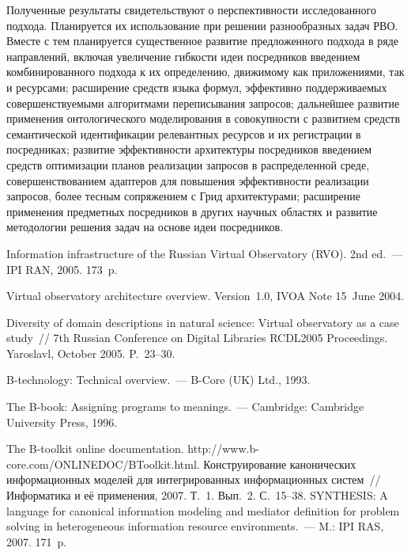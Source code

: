 \begin{multicols}{2}
     Полученные результаты свидетельствуют о перспективности исследованного
подхода. Планируется их использование при решении разнообразных задач
РВО. Вместе с тем планируется существенное развитие
предложенного подхода в ряде направлений, включая увеличение гибкости идеи
посредников введением комбинированного подхода к их определению, движимому как
приложениями, так и ресурсами; расширение средств языка формул, эффективно
поддерживаемых совершенствуемыми алгоритмами переписывания запросов; дальнейшее
развитие применения онтологического моделирования в совокупности с развитием
средств %
семан\-ти\-че\-ской идентификации релевантных ресурсов и их регистрации в
посредниках; развитие эффективности архитектуры посредников введением средств
оптимизации планов реализации запросов в распределенной среде, совершенствованием
адаптеров для повышения эффективности реализации запросов, более тесным
сопряжением с Грид архитектурами; расширение применения предметных посредников в
других научных областях и развитие методологии решения задач на основе идеи
посредников.

{\small\frenchspacing
{%
\begin{thebibliography}{99}
Information infrastructure of the Russian Virtual Observatory (RVO). 2nd ed.~--- IPI RAN, 2005.
173~p.

Virtual observatory architecture overview. Version~1.0, IVOA Note 15~June 2004.

Diversity of domain descriptions in natural science: Virtual observatory as a case study~// 7th
Russian Conference on Digital Libraries RCDL2005 Proceedings. Yaroslavl, October 2005.
P.~23--30.

B-technology: Technical overview.~--- B-Core (UK) Ltd., 1993.

The B-book: Assigning programs to meanings.~---  Cambridge: Cambridge University Press,
1996.

The B-toolkit online documentation.
{\sf http://www.b-core.com/ONLINEDOC/BToolkit.html}.
Конструирование канонических информационных моделей для интегрированных
информационных систем~// Информатика и её применения,  2007. Т.~1. Вып.~2. С.~15--38.
SYNTHESIS: A language for canonical information modeling and mediator definition for
problem solving in heterogeneous information resource environments.~--- M.: IPI RAS, 2007.
171~p.


\end{thebibliography}}}
\end{multicols}
